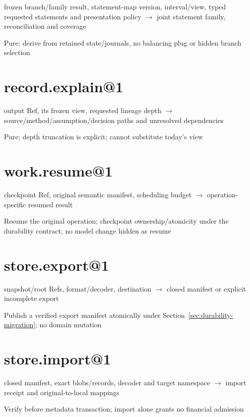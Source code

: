 frozen branch/family result, statement-map version, interval/view, typed requested statements and presentation policy \ensuremath{\rightarrow} joint statement family, reconciliation and coverage

Pure; derive from retained state/journals, no balancing plug or hidden branch selection

\hypertarget{record.explain1}{%
\section{record.explain@1}\label{record.explain1}}

output Ref, its frozen view, requested lineage depth \ensuremath{\rightarrow} source/method/assumption/decision paths and unresolved dependencies

Pure; depth truncation is explicit; cannot substitute today's view

\hypertarget{work.resume1}{%
\section{work.resume@1}\label{work.resume1}}

checkpoint Ref, original semantic manifest, scheduling budget \ensuremath{\rightarrow} operation-specific resumed result

Resume the original operation; checkpoint ownership/atomicity under the durability contract; no model change hidden as resume

\hypertarget{store.export1}{%
\section{store.export@1}\label{store.export1}}

snapshot/root Refs, format/decoder, destination \ensuremath{\rightarrow} closed manifest or explicit incomplete export

Publish a verified export manifest atomically under
Section~\ref{sec:durability-migration}; no domain mutation

\hypertarget{store.import1}{%
\section{store.import@1}\label{store.import1}}

closed manifest, exact blobs/records, decoder and target namespace \ensuremath{\rightarrow} import receipt and original-to-local mappings

Verify before metadata transaction; import alone grants no financial admission

